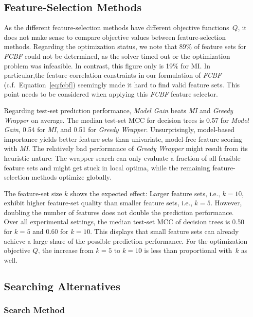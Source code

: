\documentclass{article}
\theoremstyle{definition}
\begin{document}
\subsection{Feature-Selection Methods}

As the different feature-selection methods have different objective functions~$Q$, it does not make sense to compare objective values between feature-selection methods.
Regarding the optimization status, we note that 89\% of feature sets for \emph{FCBF} could not be determined, as the solver timed out or the optimization problem was infeasible.
In contrast, this figure only is 19\% for MI.
In particular,the feature-correlation constraints in our formulation of \emph{FCBF} (c.f.~Equation~\ref{eq:fcbf}) seemingly made it hard to find valid feature sets.
This point needs to be considered when applying this \emph{FCBF} feature selector.

Regarding test-set prediction performance, \emph{Model Gain} beats \emph{MI} and \emph{Greedy Wrapper} on average.
The median test-set MCC for decision trees is 0.57 for \emph{Model Gain}, 0.54 for \emph{MI}, and 0.51 for \emph{Greedy Wrapper}.
Unsurprisingly, model-based importance yields better feature sets than univariate, model-free feature scoring with \emph{MI}.
The relatively bad performance of \emph{Greedy Wrapper} might result from its heuristic nature:
The wrapper search can only evaluate a fraction of all feasible feature sets and might get stuck in local optima, while the remaining feature-selection methods optimize globally.

The feature-set size $k$ shows the expected effect:
Larger feature sets, i.e., $k=10$, exhibit higher feature-set quality than smaller feature sets, i.e., $k=5$.
However, doubling the number of features does not double the prediction performance.
Over all experimental settings, the median test-set MCC of decision trees is 0.50 for $k=5$ and 0.60 for $k=10$.
This displays that small feature sets can already achieve a large share of the possible prediction performance.
For the optimization objective $Q$, the increase from $k=5$ to $k=10$ is less than proportional with~$k$ as well.

\subsection{Searching Alternatives}

\subsubsection{Search Method}
\end{document}
